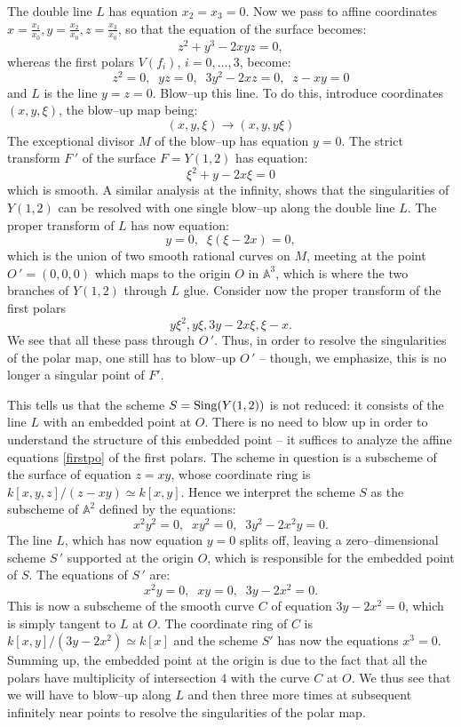 \documentclass[11pt]{article}   %
\theoremstyle{definition}
\numberwithin{Theorem}{section} \numberwithin{equation}{section}
\newcommand{\A}{{\mathbb A}}
\begin{document}
{The double line $L$ has equation $x_2=x_3=0$. Now we pass to affine
coordinates $x=\frac {x_1}{x_0}, y=\frac {x_2}{x_0}, z=\frac
{x_3}{x_0}$, so that the equation of the surface becomes:
$$z^ 2+y^ 3-2xyz=0,$$
whereas the first polars $V(f_i)$, $i=0,\dots,3$, become:
\begin{equation}\label{firstpo} z^ 2=0,\;\;yz=0,\;\; 3y^ 2-2xz=0,\;\;z-xy=0
\end{equation}
and $L$ is the line $y=z=0$. Blow--up this line. To do this,
introduce coordinates $(x,y,\xi)$, the blow--up map being:
$$(x,y,\xi)\to (x,y,y\xi)$$
The exceptional divisor $M$ of the blow--up has equation $y=0$. The
strict transform $F\,'$ of the surface $F=Y(1,2)$ has equation:
$$\xi^ 2+y-2x\xi=0$$
which is smooth. A similar analysis at the infinity, shows that the
singularities of  $Y(1,2)$ can be resolved with one single blow--up
along the double line $L$. The proper transform of $L$ has now
equation:
$$y=0,\;\; \xi(\xi-2x)=0,$$
which is the union of two smooth rational curves on $M$, meeting at
the point $O\,'=(0,0,0)$ which maps to the origin $O$ in $\A^ 3$,
which is where the two branches of $Y(1,2)$ through $L$ glue.
Consider now the proper transform of the first polars
\begin{equation}\label{firstblow}
y\xi^ 2, y\xi, 3y-2x\xi, \xi-x.
\end{equation}
 We see that all these pass through  $O\,'$.
Thus, in order to resolve the singularities of the polar map, one
still has to blow--up $O\,'$ -- though, we emphasize, this is no
longer a singular point of $F'$.

This tells us that the scheme $S={\rm Sing}(Y(1,2))$ is not reduced:
it consists of the line $L$ with an embedded point at $O$. There is
no need to blow up in order to understand the structure of this
embedded point -- it suffices to analyze the affine equations
\eqref{firstpo} of the first polars. The scheme in question is a
subscheme of the surface of equation $z=xy$, whose coordinate ring
is $k[x,y,z]/(z-xy)\simeq k[x,y]$. Hence we interpret the scheme $S$
as the subscheme of $\A^ 2$ defined by the equations:
$$x^ 2y^ 2=0,\;\;xy^ 2=0,\;\;3y^ 2-2x^ 2y=0.$$
The line $L$, which has now equation $y=0$ splits off, leaving a
zero--dimensional scheme $S\,'$ supported at the origin $O$, which
is responsible for the embedded point of $S$. The equations  of
$S\,'$ are:
$$x^ 2y=0,\;\;xy=0,\;\;3y-2x^ 2=0.$$
This is now a subscheme of the smooth curve $C$ of equation $3y-2x^
2=0$, which is simply tangent to $L$ at $O$. The coordinate ring of
$C$ is $k[x,y]/(3y-2x^ 2)\simeq k[x]$ and the scheme $S'$ has now
the equations $x^ 3=0$. Summing up, the embedded point at the
origin is due to the fact that all the polars have multiplicity of
intersection $4$ with the curve $C$ at $O$. We thus see that we will
have to blow--up along $L$ and then three more times at subsequent
infinitely near points to resolve the singularities of the polar
map.

}
\end{document}
